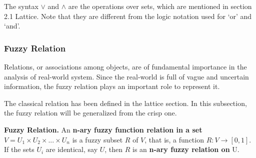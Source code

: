 The syntax $\vee$ and $\wedge$ are the operations over sets, which are mentioned in section 2.1 Lattice. Note that they are different from the logic notation used for `or' and `and'. 

\subsubsection{Fuzzy Relation}
\label{sec:FuzzyRelation}
Relations, or associations among objects, are of fundamental importance in the analysis of real-world system. Since the real-world is full of vague and uncertain information, the fuzzy relation plays an important role to represent it.

The classical relation has been defined in the lattice section. In this subsection, the fuzzy relation will be generalized from the crisp one.

\begin{defin} \textbf{Fuzzy Relation.}
\label{def:FuzzyRelation}
An \textbf{n-ary fuzzy function relation in a set} $V = U_1 \times U_2 \times ... \times U_n$ is a fuzzy subset $R$ of $V$, that is, a function $R : V \rightarrow [0,1]$. If the sets $U_i$ are identical, say $U$, then $R$ is an \textbf{n-ary fuzzy relation on} U.
 
\end{defin}